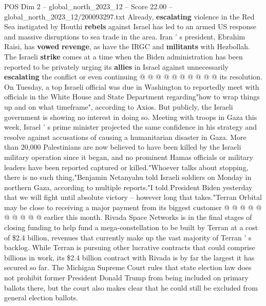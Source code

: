 \begin{textsample}{POS Dim 2 – global\_north\_2023\_12 – Score 22.00 – global\_north\_2023\_12/200093297.txt}
Already, \textbf{escalating} violence in the Red Sea instigated by Houthi \textbf{rebels} against Israel has led to an armed US response and massive disruptions to sea trade in the area.
Iran ' s president, Ebrahim Raisi, has \textbf{vowed} \textbf{revenge}, as have the IRGC and \textbf{militants} with Hezbollah.
The Israeli \textbf{strike} comes at a time when the Biden administration has been reported to be privately urging its \textbf{allies} in Israel against unnecessarily \textbf{escalating} the conflict or even continuing @ @ @ @ @ @ @ @ @ @ its resolution.
On Tuesday, a top Israeli official was due in Washington to reportedly meet with officials in the White House and State Department regarding"how to wrap things up and on what timeframe", according to Axios.
But publicly, the Israeli government is showing no interest in doing so.
Meeting with troops in Gaza this week, Israel ' s prime minister projected the same confidence in his strategy and resolve against accusations of causing a humanitarian disaster in Gaza.
More than 20,000 Palestinians are now believed to have been killed by the Israeli military operation since it began, and no prominent Hamas officials or military leaders have been reported captured or killed."Whoever talks about stopping, there is no such thing,"Benjamin Netanyahu told Israeli soldiers on Monday in northern Gaza, according to multiple reports."I told President Biden yesterday that we will fight until absolute victory -- however long that takes."Terran Orbital may be close to receiving a major payment from its biggest customer @ @ @ @ @ @ @ @ @ @ earlier this month.
Rivada Space Networks is in the final stages of closing funding to help fund a mega-constellation to be built by Terran at a cost of \$2.4 billion, revenues that currently make up the vast majority of Terran ' s backlog.
While Terran is pursuing other lucrative contracts that could comprise billions in work, its \$2.4 billion contract with Rivada is by far the largest it has secured so far.
The Michigan Supreme Court rules that state election law does not prohibit former President Donald Trump from being included on primary ballots there, but the court also makes clear that he could still be excluded from general election ballots.

\end{textsample}
